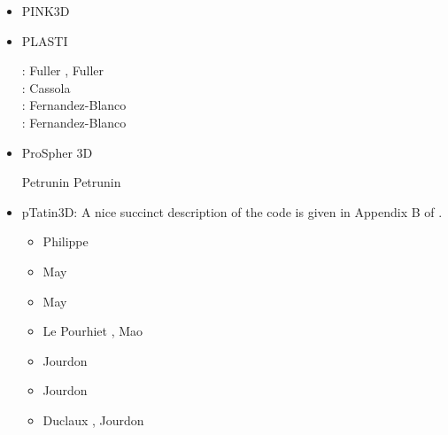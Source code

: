 \begin{itemize}
\item PINK3D

{\small
\noindent
\cite{vosc15}
}


\item PLASTI

\begin{scriptsize}
\twothousandsix: Fuller \etal \cite{fuwb06}, Fuller \etal \cite{fuwf06}\\
\twothousandthirteen: Cassola \cite{cass13}\\
\twothousandtwenty: Fernandez-Blanco \etal \cite{femb20}\\
\twothousandtwentyone: Fernandez-Blanco \etal \cite{femc21}
\end{scriptsize}

\item ProSpher 3D

Petrunin \etal \cite{pekr13} 
Petrunin \etal \cite{peke20}


\item pTatin3D: A nice succinct description of the code is given in Appendix B of \cite{lemh17}. 

\begin{scriptsize}
\begin{itemize}
\item[\twothousandthirteen] Philippe \cite{phil13}
\item[\twothousandfourteen] May \etal \cite{mabl14}
\item[\twothousandfifteen] May \etal \cite{mabl15}
\item[\twothousandseventeen] Le Pourhiet \etal \cite{lemh17}, Mao \etal \cite{magm17}
\item[\twothousandeighteen] Jourdon \etal \cite{jolp18}
\item[\twothousandnineteen] Jourdon \etal \cite{jolm19}
\item[\twothousandtwenty] Duclaux \etal \cite{duhm20}, Jourdon \etal \cite{jolm20}
\end{itemize}
\end{scriptsize}


\end{itemize}
